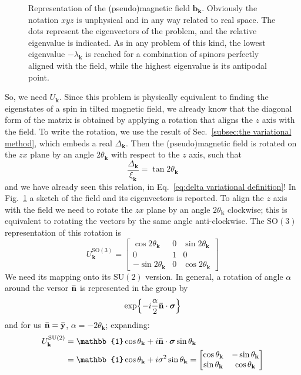 \begin{figure}
	\centering
	
	\caption{Representation of the (pseudo)magnetic field $\mathbf{b}_\mathbf{k}$. Obviously the notation $xyz$ is unphysical and in any way related to real space. The dots represent the eigenvectors of the problem, and the relative eigenvalue is indicated. As in any problem of this kind, the lowest eigenvalue $-\lambda_\mathbf{k}$ is reached for a combination of spinors perfectly aligned with the field, while the highest eigenvalue is its antipodal point.}
	\label{fig:pseudo magnetic field}
\end{figure}

So, we need $U_\mathbf{k}$. Since this problem is physically equivalent to finding the eigenstates of a spin in tilted magnetic field, we already know that the diagonal form of the matrix is obtained by applying a rotation that aligns the $z$ axis with the field. To write the rotation, we use the result of Sec.~\ref{subsec:the variational method}, which embeds a real $\Delta_\mathbf{k}$. Then the (pseudo)magnetic field is rotated on the $zx$ plane by an angle $2\theta_\mathbf{k}$ with respect to the $z$ axis, such that
\[
	\frac{\Delta_\mathbf{k}}{\xi_\mathbf{k}} =  \tan 2\theta_\mathbf{k}
\]
and we have already seen this relation, in Eq.~\eqref{eq:delta variational definition}! In Fig.~\ref{fig:pseudo magnetic field} a sketch of the field and its eigenvectors is reported. To align the $z$ axis with the field we need to rotate the $zx$ plane by an angle $2\theta_\mathbf{k}$ clockwise; this is equivalent to rotating the vectors by the same angle anti-clockwise.
The $\mathrm{SO}(3)$ representation of this rotation is
\[
	U_\mathbf{k}^{\mathrm{SO}(3)} = \begin{bmatrix}
		\cos 2\theta_\mathbf{k} & 0 & \sin 2\theta_\mathbf{k} \\
		0 & 1 & 0 \\
		- \sin 2\theta_\mathbf{k} & 0 & \cos 2\theta_\mathbf{k}
	\end{bmatrix}
\]
We need its mapping onto its $\mathrm{SU}(2)$ version. In general, a rotation of angle $\alpha$ around the versor $\mathbf{\bar{n}}$ is represented in the group by
\[
	\exp{- i \frac{\alpha}{2} \ensuremath{\mathbf{\bar{n}}} \cdot \bm{\sigma}}
\]
and for us $\mathbf{\bar{n}} = \mathbf{\bar{y}}$, $\alpha = -2\theta_\mathbf{k}$; expanding:
\[
\begin{aligned}
	U_\mathbf{k}^{\mathrm{SU}(2)} &= \mathbb{1} \cos \theta_\mathbf{k} + i \versor{n} \cdot \bm{\sigma} \sin \theta_\mathbf{k}\\
	&= \mathbb{1} \cos \theta_\mathbf{k} + i \sigma^2 \sin \theta_\mathbf{k} = \begin{bmatrix}
		\cos \theta_\mathbf{k} & -\sin \theta_\mathbf{k} \\
		\sin \theta_\mathbf{k} & \cos \theta_\mathbf{k}
	\end{bmatrix}
\end{aligned}
\]
